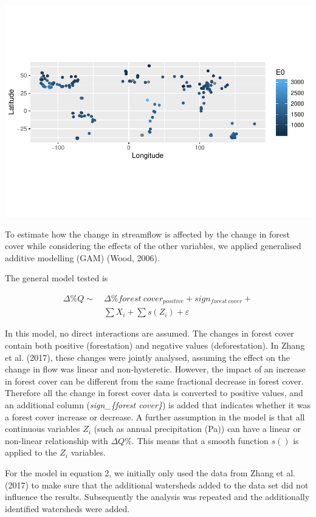 \documentclass[]{elsarticle} %
\begin{document}
\includegraphics{Forest_and_Water_files/figure-latex/unnamed-chunk-4-1.pdf}

To estimate how the change in streamflow is affected by the change in
forest cover while considering the effects of the other variables, we
applied generalised additive modelling (GAM) (Wood, 2006).

The general model tested is

\[\tag{2}
\begin{aligned}
\Delta \% Q \sim ~ &\Delta \% forest~cover_{positive} + sign_{forest~cover} + \\ & \sum{X_i} + \sum{s(Z_i)} + \varepsilon
\end{aligned}\]

In this model, no direct interactions are assumed. The changes in forest
cover contain both positive (forestation) and negative values
(deforestation). In Zhang et al. (2017), these changes were jointly
analysed, assuming the effect on the change in flow was linear and
non-hysteretic. However, the impact of an increase in forest cover can
be different from the same fractional decrease in forest cover.
Therefore all the change in forest cover data is converted to positive
values, and an additional column (\emph{sign\_\{forest cover\}}) is
added that indicates whether it was a forest cover increase or decrease.
A further assumption in the model is that all continuous variables
\(Z_i\) (such as annual precipitation (Pa)) can have a linear or
non-linear relationship with \(\Delta Q \%\). This means that a smooth
function \(s()\) is applied to the \(Z_i\) variables.

For the model in equation 2, we initially only used the data from Zhang
et al. (2017) to make sure that the additional watersheds added to the
data set did not influence the results. Subsequently the analysis was
repeated and the additionally identified watersheds were added.
\end{document}
